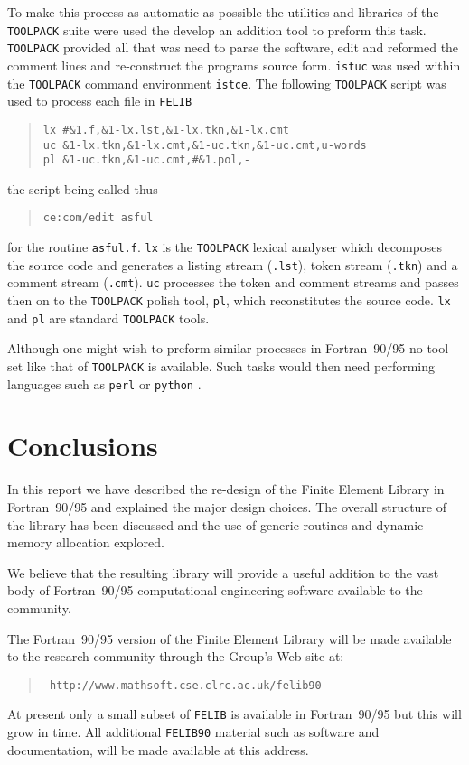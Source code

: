 \documentclass[a4paper,titlepage,11pt]{article}
\begin{document}
To make this process as automatic as possible the utilities and libraries of the {\tt TOOLPACK}
suite were used the develop an addition tool to preform this task. {\tt TOOLPACK} provided
all that was need to parse the software, edit and reformed the comment lines and re-construct
the programs source form. {\tt istuc} was used within the {\tt TOOLPACK} command environment 
{\tt istce}. The following {\tt TOOLPACK} script was used to process each file in {\tt FELIB}
\begin{quote}
\begin{verbatim}
lx #&1.f,&1-lx.lst,&1-lx.tkn,&1-lx.cmt
uc &1-lx.tkn,&1-lx.cmt,&1-uc.tkn,&1-uc.cmt,u-words
pl &1-uc.tkn,&1-uc.cmt,#&1.pol,-    
\end{verbatim}
\end{quote}
the script being called thus
\begin{quote}
\begin{verbatim}
ce:com/edit asful
\end{verbatim}
\end{quote}                                                
for the routine {\tt asful.f}. {\tt lx} is the {\tt TOOLPACK} lexical analyser which decomposes
the source code and generates a listing stream ({\tt .lst}), token stream ({\tt .tkn}) and
a comment stream ({\tt .cmt}). {\tt uc} processes the token and comment streams and passes
then on to the {\tt TOOLPACK} polish tool, {\tt pl}, which reconstitutes the source code.
{\tt lx} and {\tt pl} are standard {\tt TOOLPACK} tools.

Although one might wish to preform similar processes in Fortran~90/95 no tool set like that
of {\tt TOOLPACK} is available. Such tasks would then need performing languages such as
{\tt perl} \cite{perl} or {\tt python} \cite{python}.

\section{Conclusions}
In this report we have described the re-design of the Finite Element Library in Fortran~90/95
and explained the major design choices. The overall structure of the library has
been discussed and the use of generic routines and dynamic memory allocation
explored.

We believe that the resulting library will provide a useful addition to the
vast body of Fortran~90/95 computational engineering software available to
the community.

The Fortran~90/95 version of the Finite Element Library will be made available
to the research community through the Group's Web site at:
\begin{quote}
\tt\small
http://www.mathsoft.cse.clrc.ac.uk/felib90
\end{quote}
At present only a small subset of {\tt FELIB} is available in Fortran~90/95 but
this will grow in time. All additional {\tt FELIB90} material such as software and 
documentation, will be made available at this address.
\end{document}
